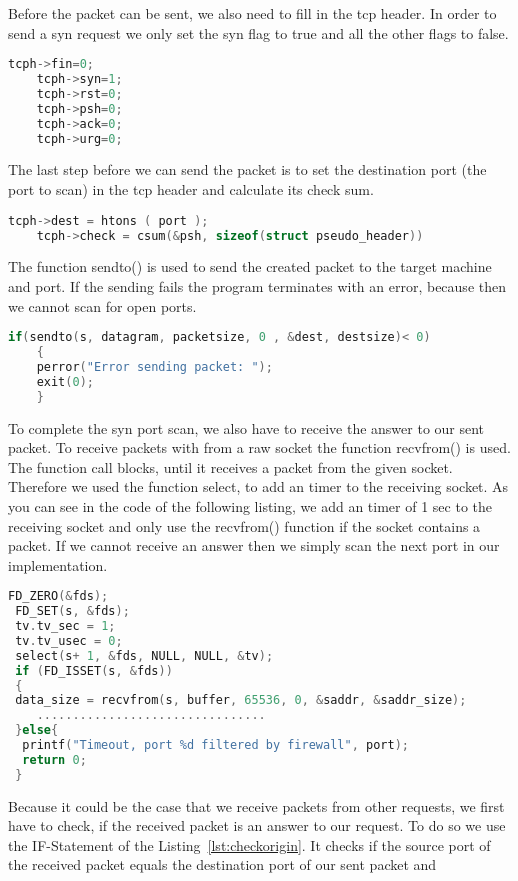 	Before the packet can be sent, we also need to fill in the tcp header. In order to send a syn request we only set the syn flag to true and all the other flags to false.
	\begin{lstlisting}[frame= single, language=C, caption= C code to set flags in tcp header]
	tcph->fin=0;
	tcph->syn=1;
	tcph->rst=0;
	tcph->psh=0;
	tcph->ack=0;
	tcph->urg=0;
	\end{lstlisting}
	The last step before we can send the packet is to set the destination port (the port to scan)  in the tcp header and calculate its check sum.
	\begin{lstlisting}[frame= single, language=C, caption= C code to set port and calculate checksum in tcp header]
	tcph->dest = htons ( port );
	tcph->check = csum(&psh, sizeof(struct pseudo_header))
	\end{lstlisting}
	The function sendto() is used to send the created packet to the target machine and port. If the sending fails the program terminates with
	an error, because then we cannot scan for open ports.
	\begin{lstlisting}[frame= single, language=C, caption= C code to set port and calculate checksum in tcp header]
	if(sendto(s, datagram, packetsize, 0 , &dest, destsize)< 0)
	{
	perror("Error sending packet: ");
	exit(0);
	}
	\end{lstlisting}
	To complete the syn port scan, we also have to receive the answer to our sent packet. To receive packets with from a raw socket the function recvfrom() is used. The function call blocks, until it
	receives a packet from the given socket. Therefore we used the function select, to add an timer to the receiving socket. As you can see in the code of the following listing, we add an timer of 1 sec
	to the receiving socket and only use the recvfrom() function if the socket contains a packet. If we cannot receive an answer then we simply scan the next port in our implementation.
	\begin{lstlisting}[frame= single, language=C, caption= C code to receive the packet]
 FD_ZERO(&fds);
 FD_SET(s, &fds);
 tv.tv_sec = 1;
 tv.tv_usec = 0;
 select(s+ 1, &fds, NULL, NULL, &tv);		
 if (FD_ISSET(s, &fds))
 {
 data_size = recvfrom(s, buffer, 65536, 0, &saddr, &saddr_size);
	................................
 }else{
  printf("Timeout, port %d filtered by firewall", port);
  return 0;
 }
	\end{lstlisting}
	Because it could be the case that we receive packets from other requests, we first have to check, if the received packet
	is an answer to our request. To do so we use the IF-Statement of the Listing~\ref{lst:checkorigin}. It checks if the source port of the received packet equals the destination port of our sent packet and
